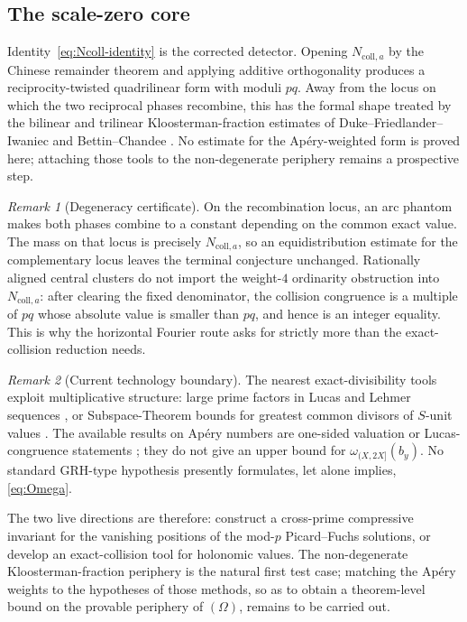 \documentclass[11pt]{amsart}
\theoremstyle{plain}
\theoremstyle{remark}
\newtheorem{remark}{Remark}
\begin{document}
\subsection{The scale-zero core}

Identity~\eqref{eq:Ncoll-identity} is the corrected detector.  Opening
$N_{\mathrm{coll},a}$ by the Chinese remainder theorem and applying
additive orthogonality produces a reciprocity-twisted quadrilinear form
with moduli $pq$.  Away from the locus on which the two reciprocal
phases recombine, this has the formal shape treated by the bilinear and
trilinear Kloosterman-fraction estimates of Duke--Friedlander--Iwaniec
and Bettin--Chandee \cite{DFI1997,BettinChandee2018}.  No estimate for
the Ap\'ery-weighted form is proved here; attaching those tools to the
non-degenerate periphery remains a prospective step.

\begin{remark}[Degeneracy certificate]
On the recombination locus, an arc phantom makes both phases combine
to a constant depending on the common exact value.  The mass on that
locus is precisely $N_{\mathrm{coll},a}$, so an equidistribution
estimate for the complementary locus leaves the terminal conjecture
unchanged.  Rationally aligned central clusters do not import the
weight-$4$ ordinarity obstruction into $N_{\mathrm{coll},a}$: after
clearing the fixed denominator, the collision congruence is a multiple
of $pq$ whose absolute value is smaller than $pq$, and hence is an
integer equality.  This is why the horizontal Fourier route asks for
strictly more than the exact-collision reduction needs.
\end{remark}

\begin{remark}[Current technology boundary]
The nearest exact-divisibility tools exploit multiplicative structure:
large prime factors in Lucas and Lehmer sequences
\cite{Stewart2012}, or Subspace-Theorem bounds for greatest common
divisors of $S$-unit values \cite{CorvajaZannier2005}.  The available
results on Ap\'ery numbers are one-sided valuation or Lucas-congruence
statements \cite{LucaShparlinski2008,Delaygue2018,
RowlandYassawiKrattenthaler2021}; they do not give an upper bound for
$\omega_{(X,2X]}(b_y)$.  No standard GRH-type hypothesis presently
formulates, let alone implies, \eqref{eq:Omega}.

The two live directions are therefore: construct a cross-prime
compressive invariant for the vanishing positions of the mod-$p$
Picard--Fuchs solutions, or develop an exact-collision tool for
holonomic values.  The non-degenerate Kloosterman-fraction periphery
\cite{DFI1997,BettinChandee2018} is the natural first
test case; matching the Ap\'ery weights to the hypotheses of those
methods, so as to obtain a theorem-level bound on the provable
periphery of $(\Omega)$, remains to be carried out.
\end{remark}
\end{document}
